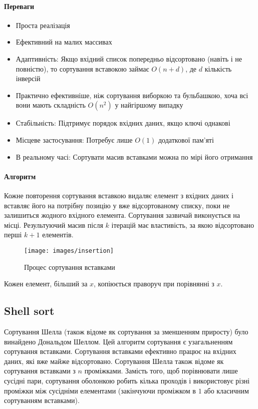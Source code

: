 \paragraph{Переваги}
\begin{itemize}
	\item Проста реалізація
	\item Ефективний на малих массивах
	\item Адаптивність: Якщо вхідний список попередньо відсортовано (навіть і не повністю), то сортування вставокою займає \(O(n + d)\), де \(d\) кількість інверсій
	\item Практично ефективніше, ніж сортування виборкою та бульбашкою, хоча всі вони
	мають складність \(O(n^2)\) у найгіршому випадку 
	\item Стабільність: Підтримує порядок вхідних даних, якщо ключі однакові
	\item Місцеве застосування: Потребує лише \(O(1)\) додаткової пам'яті
	\item В реальному часі: Сортувати масив вставками можна по мірі його отримання
\end{itemize}
\paragraph{Алгоритм}
Кожне повторення сортування вставкою видаляє елемент з вхідних даних і вставляє його на потрібну позицію у вже відсортованому списку, поки не залишиться жодного вхідного елемента. Сортування зазвичай виконується на місці. Результуючий масив після \(k\) ітерацій має властивість, за якою відсортовано перші \(k+1\) елементів.
\begin{figure}[H]
	\centering
	\texttt{[image: images/insertion]}
	\caption{Процес сортування вставками}
	\label{fig:ins}
\end{figure}
Кожен елемент, більший за \(x\), копіюється праворуч при порівнянні з \(x\).
\subsection{Shell sort}
Сортування Шелла (також відоме як сортування за зменшенням приросту) було
винайдено Дональдом Шеллом. Цей алгоритм сортування є узагальненням сортування
вставками. Сортування вставками ефективно працює на вхідних даних, які вже
майже відсортовано. Сортування Шелла також відоме як сортування вставками з
\(n\) проміжками. Замість того, щоб порівнювати лише сусідні пари, сортування
оболонкою робить кілька проходів і використовує різні проміжки між сусідніми
елементами (закінчуючи проміжком в \(1\) або класичним сортуванням вставками).

